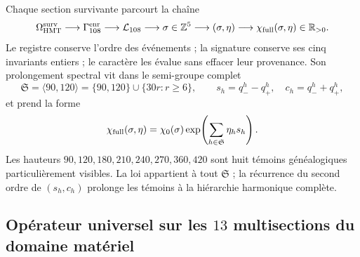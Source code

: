 Chaque section survivante parcourt la chaîne
\begin{equation}
 \Omega_{\rm HMT}^{\rm surv}
 \longrightarrow\Gamma_{108}^{\rm enr}
 \longrightarrow\mathcal L_{108}
 \longrightarrow\sigma\in\mathbb Z^5
 \longrightarrow(\sigma,\eta)
 \longrightarrow\chi_{\rm full}(\sigma,\eta)\in\mathbb R_{>0}.
 \label{eq:cadena-genealogica-ley-masa-autonoma}
\end{equation}
Le registre conserve l'ordre des événements ; la signature conserve ses cinq
invariants entiers ; le caractère les évalue sans effacer leur provenance. Son
prolongement spectral vit dans le semi-groupe complet
\begin{equation}
 \mathfrak S=\langle90,120\rangle
 =\{90,120\}\cup\{30r:r\ge6\},
 \qquad
 s_h=q_-^h-q_+^h,
 \quad c_h=q_-^h+q_+^h,
 \label{eq:semigrupo-global-masas-autonoma}
\end{equation}
et prend la forme
\begin{equation}
 \chi_{\rm full}(\sigma,\eta)
 =\chi_0(\sigma)
  \exp\!\left(\sum_{h\in\mathfrak S}\eta_hs_h\right).
 \label{eq:caracter-completo-masas-autonoma}
\end{equation}
Les hauteurs \(90,120,180,210,240,270,360,420\) sont huit témoins
généalogiques particulièrement visibles. La loi appartient à tout
\(\mathfrak S\) ; la récurrence du second ordre de \((s_h,c_h)\) prolonge
les témoins à la hiérarchie harmonique complète.

\subsection{Opérateur universel sur les \(13\) multisections du domaine matériel}

